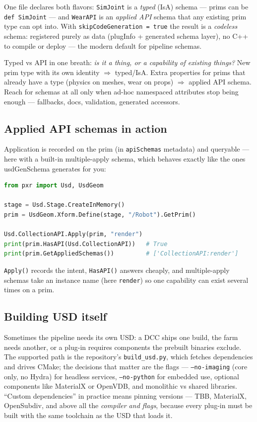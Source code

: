 \noindent One file declares both flavors: \texttt{SimJoint} is a
\emph{typed} (IsA) schema --- prims can be \texttt{def SimJoint} --- and
\texttt{WearAPI} is an \emph{applied API} schema that any existing prim type
can opt into. With \texttt{skipCodeGeneration = true} the result is a
\emph{codeless} schema: registered purely as data (plugInfo +
generated schema layer), no C++ to compile or deploy --- the modern default
for pipeline schemas.

\begin{ExamTip}
Typed vs API in one breath: \emph{is it a thing, or a capability of existing
things?} New prim type with its own identity $\Rightarrow$ typed/IsA.
Extra properties for prims that already have a type (physics on meshes,
wear on props) $\Rightarrow$ applied API schema. Reach for schemas at all
only when ad-hoc namespaced attributes stop being enough --- fallbacks,
docs, validation, generated accessors.
\end{ExamTip}

\subsection{Applied API schemas in action}\label{sec:cu-api}
Application is recorded on the prim (in \texttt{apiSchemas} metadata) and
queryable --- here with a built-in multiple-apply schema, which behaves
exactly like the ones usdGenSchema generates for you:

\begin{lstlisting}[language=Python]
from pxr import Usd, UsdGeom

stage = Usd.Stage.CreateInMemory()
prim = UsdGeom.Xform.Define(stage, "/Robot").GetPrim()

Usd.CollectionAPI.Apply(prim, "render")
print(prim.HasAPI(Usd.CollectionAPI))   # True
print(prim.GetAppliedSchemas())         # ['CollectionAPI:render']
\end{lstlisting}

\noindent\texttt{Apply()} records the intent, \texttt{HasAPI()} answers
cheaply, and multiple-apply schemas take an instance name (here
\texttt{render}) so one capability can exist several times on a prim.

\subsection{Building USD itself}\label{sec:cu-build}
Sometimes the pipeline needs its own USD: a DCC ships
one build, the farm needs another, or a plug-in requires components the
prebuilt binaries exclude. The supported path is the repository's
\texttt{build\_usd.py}, which fetches dependencies and drives CMake; the
decisions that matter are the flags --- \texttt{--no-imaging} (core only, no
Hydra) for headless services, \texttt{--no-python} for embedded use,
optional components like MaterialX or OpenVDB, and monolithic vs shared
libraries. ``Custom dependencies'' in practice means pinning versions ---
TBB, MaterialX, OpenSubdiv, and above all the \emph{compiler and flags},
because every plug-in must be built with the same toolchain as the USD that
loads it.

